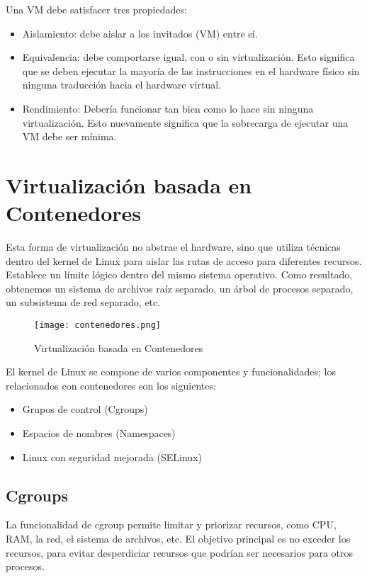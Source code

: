 Una VM debe satisfacer tres propiedades:
\begin{itemize}
    \setlength\itemsep{-0.6em}
    \item Aislamiento: debe aislar a los invitados (VM) entre sí. 
    \item Equivalencia: debe comportarse igual, con o sin virtualización. Esto 
    significa que se deben ejecutar la mayoría de las instrucciones en el hardware 
    físico sin ninguna traducción hacia el hardware virtual.
    \item Rendimiento: Debería funcionar tan bien como lo hace sin ninguna 
    virtualización. Esto nuevamente significa que la sobrecarga de ejecutar 
    una VM debe ser mínima.
\end{itemize}

\section{Virtualización basada en Contenedores}

Esta forma de virtualización no abstrae el hardware, sino que utiliza técnicas 
dentro del kernel de Linux para aislar las rutas de acceso para diferentes recursos. 
Establece un límite lógico dentro del mismo sistema operativo. Como resultado, obtenemos 
un sistema de archivos raíz separado, un árbol de procesos separado, un subsistema 
de red separado, etc.

\begin{center}
    \begin{figure}   
       \begin{center}
          \texttt{[image: contenedores.png]}
       \end{center}
       \caption{Virtualización basada en Contenedores}
    \end{figure}
 \end{center}

El kernel de Linux se compone de varios componentes y funcionalidades; los relacionados 
con contenedores son los siguientes:
\begin{itemize}
    \setlength\itemsep{-0.6em}
    \item Grupos de control (Cgroups)
    \item Espacios de nombres (Namespaces)
    \item Linux con seguridad mejorada (SELinux)
\end{itemize}

\subsection*{Cgroups}
La funcionalidad de cgroup permite limitar y priorizar recursos, como CPU, RAM, 
la red, el sistema de archivos, etc. El objetivo principal es no exceder los 
recursos, para evitar desperdiciar recursos que podrían ser necesarios para 
otros procesos.

